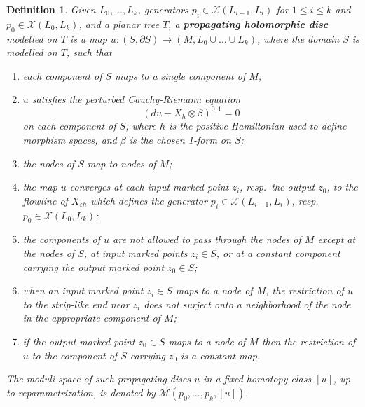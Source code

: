 \documentclass[11pt,leqno]{amsart}
\newtheorem{defi}[theo]{Definition}
\numberwithin{equation}{section}
\newcommand{\cM}{{\mathcal M}}
\newcommand{\cX}{{\mathcal X}}
\begin{document}
\begin{defi}\label{def:proptree}
Given $L_0,\dots,L_k$, generators $p_i\in \cX(L_{i-1},L_i)$ for $1\leq i\leq k$
and $p_0\in \cX(L_0,L_k)$, and a planar tree $T$\!,
a {\bf propagating holomorphic disc} modelled on $T$ is a map
$u:(S,\partial S)\to (M,L_0\cup\dots\cup L_k)$, where the domain $S$
is modelled on $T$, such that 
\begin{enumerate}
\item each component of $S$ maps to a single
component of $M$;
\item $u$ satisfies the perturbed Cauchy-Riemann equation
\begin{equation}\label{eq:cauchyriemann}
(du-X_h\otimes \beta)^{0,1}=0
\end{equation} 
on each component of $S$, where
$h$ is the positive Hamiltonian used to define morphism spaces, and $\beta$ is the chosen
1-form on $S$;
\item the nodes of $S$ map to nodes of $M$;
\item the map $u$ converges at each input marked point $z_i$, resp.\ the output $z_0$, to the flowline
of $X_{\varepsilon h}$ which defines the generator $p_i\in \cX(L_{i-1},L_i)$, resp.\
$p_0\in \cX(L_0,L_k)$;
\item the components of $u$ are not allowed to pass through the nodes of
$M$ except at the nodes of $S$, at input marked points 
$z_i\in S$, or at a constant component carrying the output marked point $z_0\in S$;
\item  when an input marked point $z_i\in S$ maps to a node of $M$,
the restriction of $u$ to the strip-like end near $z_i$
 does not surject onto a neighborhood of the node in the appropriate component of $M$;
\item if the output marked point $z_0\in S$ maps to a node of $M$ then the restriction
of $u$ to the component of $S$ carrying $z_0$ is a constant map.
\end{enumerate}
The moduli space of such propagating discs $u$ 
in a fixed homotopy class $[u]$, up to reparametrization, 
is denoted by $\cM(p_0,\dots,p_k,[u])$.
\end{defi}
\end{document}
